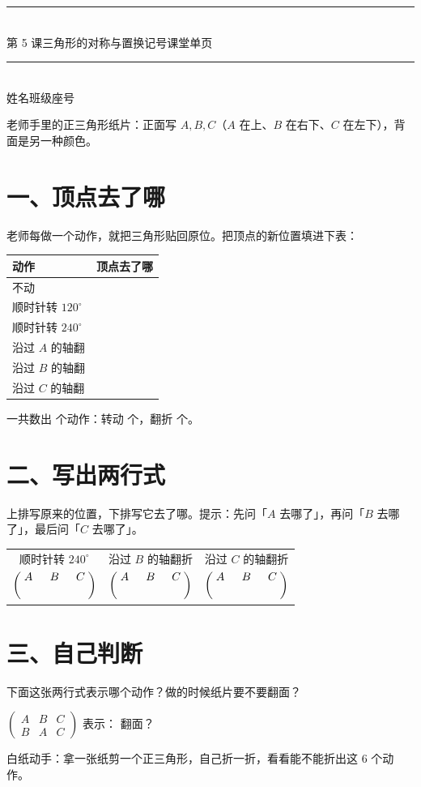 \documentclass[11pt]{ctexart}
\newcommand{\biaoti}[2]{%
  {\color{pagegreen}\rule{\textwidth}{1.2pt}}\\[6pt]
  {\heiti\Large 第 #1 课\quad #2}\hfill{\small\songti 课堂单页}\\[6pt]
  {\color{pagegreen}\rule{\textwidth}{0.5pt}}\\[4pt]
  {\small 姓名\underline{\hspace{3.2cm}}\qquad 班级\underline{\hspace{2.4cm}}\qquad 座号\underline{\hspace{1.6cm}}}
  \vspace{0.4em}
}
\newcommand{\kongshi}{%
  $\begin{pmatrix}
     A & B & C\\[2pt]
     \hspace{1.3em} & \hspace{1.3em} & \hspace{1.3em}
   \end{pmatrix}$%
}
\begin{document}
\biaoti{5}{三角形的对称与置换记号}

\noindent 老师手里的正三角形纸片：正面写 \(A,B,C\)（\(A\) 在上、\(B\) 在右下、\(C\) 在左下），背面是另一种颜色。

\section*{一、顶点去了哪}

\noindent 老师每做一个动作，就把三角形贴回原位。把顶点的新位置填进下表：

\begin{center}
\begin{tabular}{@{}lccl@{}}
  \toprule
  动作 & \multicolumn{3}{c}{顶点去了哪} \\
  \midrule
  \rule{0pt}{2.4ex}不动 & & & \\
  \rule{0pt}{2.4ex}顺时针转 \(120^\circ\) & & & \\
  \rule{0pt}{2.4ex}顺时针转 \(240^\circ\) & & & \\
  \rule{0pt}{2.4ex}沿过 \(A\) 的轴翻 & & & \\
  \rule{0pt}{2.4ex}沿过 \(B\) 的轴翻 & & & \\
  \rule{0pt}{2.4ex}沿过 \(C\) 的轴翻 & & & \\
  \bottomrule
\end{tabular}
\end{center}

\noindent 一共数出 \underline{\hspace{1.8cm}} 个动作：转动 \underline{\hspace{1.2cm}} 个，翻折 \underline{\hspace{1.2cm}} 个。

\section*{二、写出两行式}

\noindent 上排写原来的位置，下排写它去了哪。提示：先问「\(A\) 去哪了」，再问「\(B\) 去哪了」，最后问「\(C\) 去哪了」。

\begin{center}
\begin{tabular}{@{}ccc@{}}
  \rule{0pt}{2.6ex}顺时针转 \(240^\circ\) & 沿过 \(B\) 的轴翻折 & 沿过 \(C\) 的轴翻折 \\[8pt]
  \kongshi & \kongshi & \kongshi \\
\end{tabular}
\end{center}

\section*{三、自己判断}

\noindent 下面这张两行式表示哪个动作？做的时候纸片要不要翻面？

\begin{center}
{\large
$\begin{pmatrix}A&B&C\\B&A&C\end{pmatrix}$ \quad 表示：\underline{\hspace{5.6cm}} \quad 翻面？\underline{\hspace{2.2cm}}
}
\end{center}

\vspace{0.2em}
\noindent 白纸动手：拿一张纸剪一个正三角形，自己折一折，看看能不能折出这 \(6\) 个动作。
\end{document}
